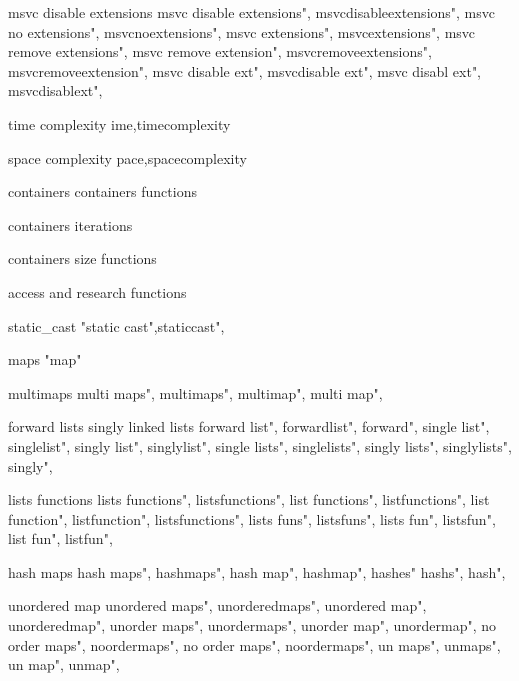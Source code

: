          msvc disable extensions 
        msvc disable extensions", 
        msvcdisableextensions", 
        msvc no extensions", 
        msvcnoextensions", 
        msvc extensions", 
        msvcextensions", 
        msvc remove extensions", 
        msvc remove extension", 
        msvcremoveextensions", 
        msvcremoveextension", 
        msvc disable ext", 
        msvcdisable ext", 
        msvc disabl ext", 
        msvcdisablext", 

         time complexity
        ime,timecomplexity
        
         space complexity
        pace,spacecomplexity
        
         containers
         containers functions
        
         containers iterations
        
         containers size functions 
        
         access and research functions 
        
         static_cast 
         "static cast",staticcast",
        
         maps
         "map"
        
         multimaps
        multi maps",
        multimaps", 
        multimap",
        multi map", 
        
         forward lists singly linked lists
        forward list",  
        forwardlist",  
        forward",  
        single list",  
        singlelist",  
        singly list",  
        singlylist",  
        single lists",  
        singlelists",  
        singly lists",  
        singlylists",  
        singly",  
        
         lists functions 
        lists functions",  
        listsfunctions",  
        list functions",  
        listfunctions",  
        list function",  
        listfunction",  
        listsfunctions",  
        lists funs",  
        listsfuns",  
        lists fun",  
        listsfun",  
        list fun",  
        listfun",  
         
         hash maps 
        hash maps",
        hashmaps", 
        hash map", 
        hashmap",
        hashes"
        hashs",
        hash",
        
         unordered map 
        unordered maps", 
        unorderedmaps", 
        unordered map", 
        unorderedmap", 
        unorder maps", 
        unordermaps", 
        unorder map", 
        unordermap", 
        no order maps", 
        noordermaps", 
        no order maps", 
        noordermaps", 
        un maps", 
        unmaps", 
        un map", 
        unmap", 
         
